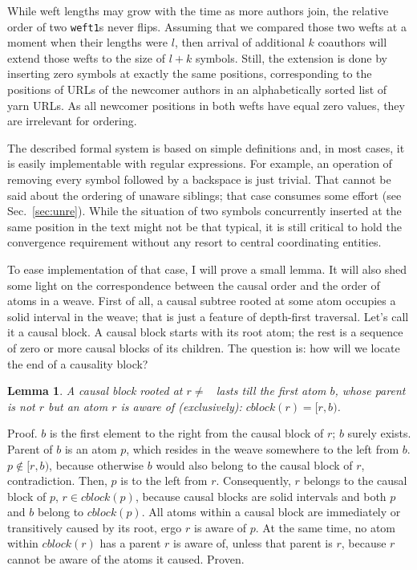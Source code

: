 \documentclass{acm_proc_article-sp}
\newtheorem{lemma}{Lemma}
\begin{document}
While weft lengths may grow with the time as more authors
join, the relative order of two {\tt weft1}s never flips.
Assuming that we compared those two wefts at a moment when
their lengths were $l$, then arrival of additional $k$ coauthors
will extend those wefts to the size of $l+k$ symbols. Still,
the extension is done by inserting zero symbols at exactly
the same positions, corresponding to the positions of URLs
of the newcomer authors in an alphabetically sorted list
of yarn URLs. As all newcomer positions in both wefts have
equal zero values, they are irrelevant for ordering.

The described formal system is based on simple definitions
and, in most cases, it is easily implementable with regular
expressions. For example, an operation of removing every
symbol followed by a backspace is just trivial. That cannot
be said about the ordering of unaware siblings; that
case consumes some effort (see Sec.~\ref{sec:unre}). While the
situation of two symbols concurrently inserted at the same position
in the text might not be that typical, it is still critical
to hold the convergence requirement without any resort to
central coordinating entities. 

To ease implementation of that case, I will prove
a small lemma. It will also shed some light on the
correspondence between the causal order and the order of atoms
in a weave.
First of all, a causal subtree rooted at some atom occupies
a solid interval in the weave; that is just a feature of
depth-first traversal. Let's call it a causal block.
A causal block starts with its root atom; the rest is
a sequence of zero or more causal blocks of its children.
The question is: how will we locate the end of a causality
block?
\begin{lemma} A causal block rooted at $r \ne$ \aum ~lasts till
the first atom $b$, whose parent is not $r$ but an atom
$r$ is aware of (exclusively):  $cblock(r) = [r,b)$. \label{lemma:1}
\end{lemma} 
Proof. $b$ is the first element to the right from the causal
block of $r$; $b$ surely exists. Parent of $b$ is an atom $p$,
which resides in the weave somewhere to the left from $b$.
$p \notin [r,b)$, because otherwise $b$ would also belong
to the causal block of $r$, contradiction.
Then, $p$ is to the left from $r$. Consequently, $r$ belongs
to the causal block of $p$, $r \in cblock(p)$, because
causal blocks are solid intervals and both $p$ and $b$
belong to $cblock(p)$. All atoms within a causal block are
immediately or transitively caused by its root,
ergo $r$ is aware of $p$. At the same time, no atom
within $cblock(r)$ has a parent $r$ is aware of, unless
that parent is $r$, because $r$ cannot be aware of the
atoms it caused. Proven.
\end{document}
